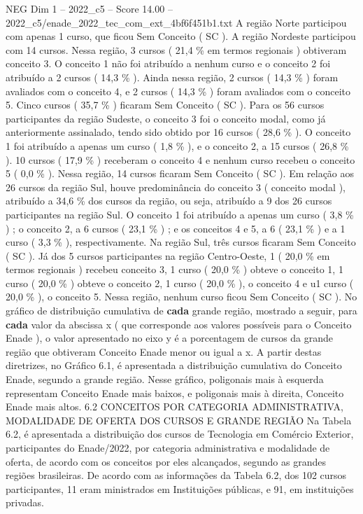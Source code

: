 \begin{textsample}{NEG Dim 1 – 2022\_c5 – Score 14.00 – 2022\_c5/enade\_2022\_tec\_com\_ext\_4bf6f451b1.txt}
A região Norte participou com apenas 1 curso, que ficou Sem Conceito ( SC ).
A região Nordeste participou com 14 cursos.
Nessa região, 3 cursos ( 21,4 \% em termos regionais ) obtiveram conceito 3.
O conceito 1 não foi atribuído a nenhum curso e o conceito 2 foi atribuído a 2 cursos ( 14,3 \% ).
Ainda nessa região, 2 cursos ( 14,3 \% ) foram avaliados com o conceito 4, e 2 cursos ( 14,3 \% ) foram avaliados com o conceito 5.
Cinco cursos ( 35,7 \% ) ficaram Sem Conceito ( SC ).
Para os 56 cursos participantes da região Sudeste, o conceito 3 foi o conceito modal, como já anteriormente assinalado, tendo sido obtido por 16 cursos ( 28,6 \% ).
O conceito 1 foi atribuído a apenas um curso ( 1,8 \% ), e o conceito 2, a 15 cursos ( 26,8 \% ). 10 cursos ( 17,9 \% ) receberam o conceito 4 e nenhum curso recebeu o conceito 5 ( 0,0 \% ).
Nessa região, 14 cursos ficaram Sem Conceito ( SC ).
Em relação aos 26 cursos da região Sul, houve predominância do conceito 3 ( conceito modal ), atribuído a 34,6 \% dos cursos da região, ou seja, atribuído a 9 dos 26 cursos participantes na região Sul.
O conceito 1 foi atribuído a apenas um curso ( 3,8 \% ) ; o conceito 2, a 6 cursos ( 23,1 \% ) ; e os conceitos 4 e 5, a 6 ( 23,1 \% ) e a 1 curso ( 3,3 \% ), respectivamente.
Na região Sul, três cursos ficaram Sem Conceito ( SC ).
Já dos 5 cursos participantes na região Centro-Oeste, 1 ( 20,0 \% em termos regionais ) recebeu conceito 3, 1 curso ( 20,0 \% ) obteve o conceito 1, 1 curso ( 20,0 \% ) obteve o conceito 2, 1 curso ( 20,0 \% ), o conceito 4 e u1 curso ( 20,0 \% ), o conceito 5.
Nessa região, nenhum curso ficou Sem Conceito ( SC ).
No gráfico de distribuição cumulativa de \textbf{cada} grande região, mostrado a seguir, para \textbf{cada} valor da abscissa x ( que corresponde aos valores possíveis para o Conceito Enade ), o valor apresentado no eixo y é a porcentagem de cursos da grande região que obtiveram Conceito Enade menor ou igual a x.
A partir destas diretrizes, no Gráfico 6.1, é apresentada a distribuição cumulativa do Conceito Enade, segundo a grande região.
Nesse gráfico, poligonais mais à esquerda representam Conceito Enade mais baixos, e poligonais mais à direita, Conceito Enade mais altos. 6.2 CONCEITOS POR CATEGORIA ADMINISTRATIVA, MODALIDADE DE OFERTA DOS CURSOS E GRANDE REGIÃO Na Tabela 6.2, é apresentada a distribuição dos cursos de Tecnologia em Comércio Exterior, participantes do Enade/2022, por categoria administrativa e modalidade de oferta, de acordo com os conceitos por eles alcançados, segundo as grandes regiões brasileiras.
De acordo com as informações da Tabela 6.2, dos 102 cursos participantes, 11 eram ministrados em Instituições públicas, e 91, em instituições privadas.

\end{textsample}
